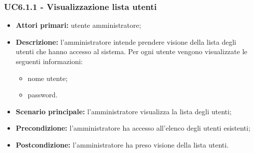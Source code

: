 \subsubsection{UC6.1.1 - Visualizzazione lista utenti}
\begin{itemize}
	\item \textbf{Attori primari:} utente amministratore;
	\item \textbf{Descrizione:} l'amministratore intende prendere visione della lista degli utenti che hanno accesso al sistema. Per ogni utente vengono visualizzate le seguenti informazioni:
		\begin{itemize}
			\item nome utente;
			\item password.
		\end{itemize}
	\item \textbf{Scenario principale:} l'amministratore visualizza la lista degli utenti;
	\item \textbf{Precondizione:} l'amministratore ha accesso all'elenco degli utenti esistenti;
	\item \textbf{Postcondizione:} l'amministratore ha preso visione della lista utenti.
\end{itemize}

